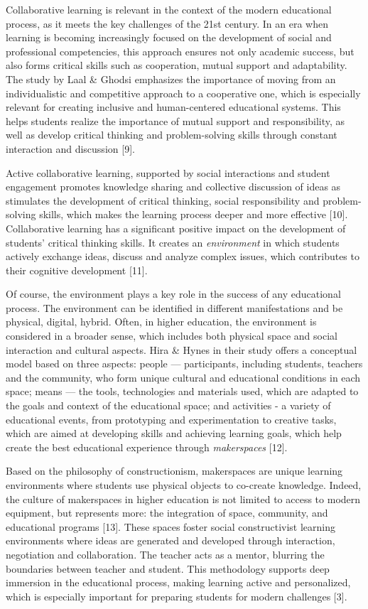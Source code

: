 Collaborative learning is relevant in the context of the modern
educational process, as it meets the key challenges of the 21st century.
In an era when learning is becoming increasingly focused on the
development of social and professional competencies, this approach
ensures not only academic success, but also forms critical skills such
as cooperation, mutual support and adaptability. The study by Laal \&
Ghodsi emphasizes the importance of moving from an individualistic and
competitive approach to a cooperative one, which is especially relevant
for creating inclusive and human-centered educational systems. This
helps students realize the importance of mutual support and
responsibility, as well as develop critical thinking and problem-solving
skills through constant interaction and discussion {[}9{]}.

Active collaborative learning, supported by social interactions and
student engagement promotes knowledge sharing and collective discussion
of ideas as stimulates the development of critical thinking, social
responsibility and problem-solving skills, which makes the learning
process deeper and more effective {[}10{]}. Collaborative learning has a
significant positive impact on the development of
students'{} critical thinking skills. It creates an
\emph{environment} in which students actively exchange ideas, discuss
and analyze complex issues, which contributes to their cognitive
development {[}11{]}.

Of course, the environment plays a key role in the success of any
educational process. The environment can be identified in different
manifestations and be physical, digital, hybrid. Often, in higher
education, the environment is considered in a broader sense, which
includes both physical space and social interaction and cultural
aspects. Hira \& Hynes in their study offers a conceptual model based on
three aspects: people --- participants, including students, teachers and
the community, who form unique cultural and educational conditions in
each space; means --- the tools, technologies and materials used, which
are adapted to the goals and context of the educational space; and
activities - a variety of educational events, from prototyping and
experimentation to creative tasks, which are aimed at developing skills
and achieving learning goals, which help create the best educational
experience through \emph{makerspaces} {[}12{]}.

Based on the philosophy of constructionism, makerspaces are unique
learning environments where students use physical objects to co-create
knowledge. Indeed, the culture of makerspaces in higher education is not
limited to access to modern equipment, but represents more: the
integration of space, community, and educational programs {[}13{]}.
These spaces foster social constructivist learning environments where
ideas are generated and developed through interaction, negotiation and
collaboration. The teacher acts as a mentor, blurring the boundaries
between teacher and student. This methodology supports deep immersion in
the educational process, making learning active and personalized, which
is especially important for preparing students for modern challenges
{[}3{]}.\hspace{0pt}

